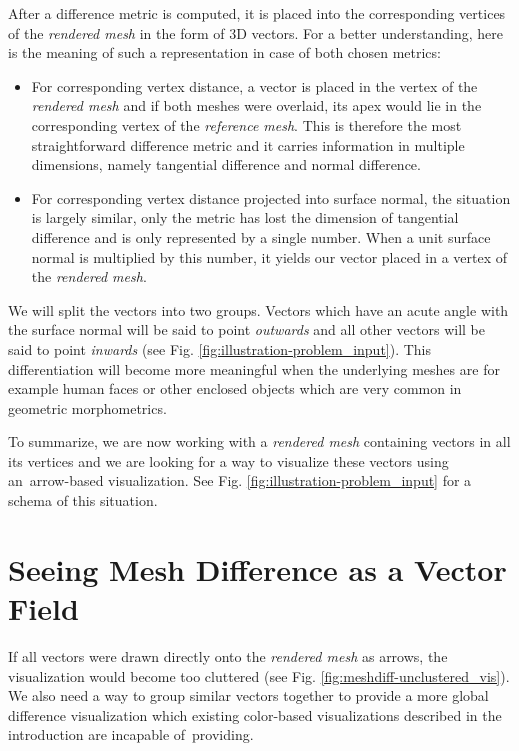 After a difference metric is computed, it is placed into the corresponding vertices of the {\it rendered mesh} in the form of 3D vectors. For a better understanding, here is the meaning of such a representation in case of both chosen metrics:

\begin{itemize}
\item For corresponding vertex distance, a vector is placed in the vertex of the {\it rendered mesh} and if both meshes were overlaid, its apex would lie in the corresponding vertex of the {\it reference mesh}. This is therefore the most straightforward difference metric and it carries information in multiple dimensions, namely tangential difference and normal difference.
\item For corresponding vertex distance projected into surface normal, the situation is largely similar, only the metric has lost the dimension of tangential difference and is only represented by a single number. When a unit surface normal is multiplied by this number, it yields our vector placed in a vertex of the {\it rendered mesh}.
\end{itemize}

We will split the vectors into two groups. Vectors which have an acute angle with the surface normal will be said to point {\it outwards} and all other vectors will be said to point {\it inwards} (see Fig. \ref{fig:illustration-problem_input}). This differentiation will become more meaningful when the underlying meshes are for example human faces or other enclosed objects which are very common in geometric morphometrics.

To summarize, we are now working with a {\it rendered mesh} containing vectors in all its vertices and we are looking for a way to visualize these vectors using an~arrow-based visualization. See Fig. \ref{fig:illustration-problem_input} for a schema of this situation.

\section{Seeing Mesh Difference as a Vector Field}
\label{sec:analysis-abstraction}

If all vectors were drawn directly onto the {\it rendered mesh} as arrows, the visualization would become too cluttered (see Fig. \ref{fig:meshdiff-unclustered_vis}). We also need a way to group similar vectors together to provide a more global difference visualization which existing color-based visualizations described in the introduction are incapable of~providing.

